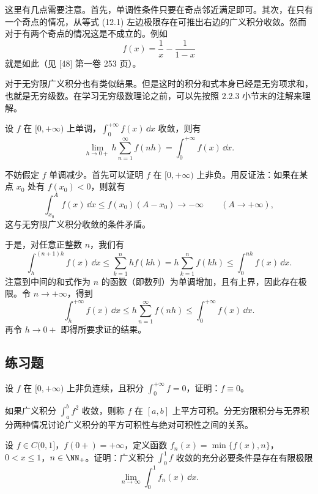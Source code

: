 \begin{xremark}
这里有几点需要注意。首先，单调性条件只要在奇点邻近满足即可。其次，在只有一个奇点的情况，从等式 (12.1) 左边极限存在可推出右边的广义积分收敛。然而对于有两个奇点的情况这是不成立的。例如
\[
  f(x)=\frac1x-\frac1{1-x}
\]
就是如此（见 [48] 第一卷 253 页）。
\end{xremark}

对于无穷限广义积分也有类似结果。但是这时的积分和式本身已经是无穷项求和，也就是无穷级数。在学习无穷级数理论之前，可以先按照 2.2.3 小节末的注解来理解。

\begin{xexample}[12.1.2]
设 $f$ 在 $[0,+\infty)$ 上单调，$\int_0^{+\infty} f(x)\,\dd x$ 收敛，则有
\[
  \lim_{h\to0+}h\sum_{n=1}^{\infty}f(nh)=\int_0^{+\infty}f(x)\,\dd x.
\]
\end{xexample}
\begin{xproof}
不妨假定 $f$ 单调减少。首先可以证明 $f$ 在 $[0,+\infty)$ 上非负。用反证法：如果在某点 $x_0$ 处有 $f(x_0)<0$，则就有
\[
  \int_{x_0}^A f(x)\,\dd x\leq f(x_0)(A-x_0)\to-\infty\qquad(A\to+\infty),
\]
这与无穷限广义积分收敛的条件矛盾。

于是，对任意正整数 $n$，我们有
\[
  \int_h^{(n+1)h}f(x)\,\dd x
  \leq \sum_{k=1}^n hf(kh)
  =h\sum_{k=1}^n f(kh)
  \leq \int_0^{nh}f(x)\,\dd x.
\]
注意到中间的和式作为 $n$ 的函数（即数列）为单调增加，且有上界，因此存在极限。令 $n\to+\infty$，得到
\[
  \int_h^{+\infty}f(x)\,\dd x
  \leq h\sum_{n=1}^{\infty}f(nh)
  \leq \int_0^{+\infty}f(x)\,\dd x.
\]
再令 $h\to0+$ 即得所要求证的结果。
\end{xproof}

\subsection{练习题}

\begin{xexercise}[1]
设 $f$ 在 $[0,+\infty)$ 上非负连续，且积分 $\int_0^{+\infty}f=0$，证明：$f\equiv0$。
\end{xexercise}

\begin{xexercise}[2]
如果广义积分 $\int_a^b f^2$ 收敛，则称 $f$ 在 $[a,b]$ 上平方可积。分无穷限积分与无界积分两种情况讨论广义积分的平方可积性与绝对可积性之间的关系。
\end{xexercise}

\begin{xexercise}[3]
设 $f\in C(0,1]$，$f(0+)=+\infty$，定义函数 $f_n(x)=\min\{f(x),n\}$，$0<x\leq1$，$n\in\NN_+$。证明：广义积分 $\int_0^1f$ 收敛的充分必要条件是存在有限极限
  \[
    \lim_{n\to\infty}\int_0^1 f_n(x)\,\dd x.
  \]
\end{xexercise}

